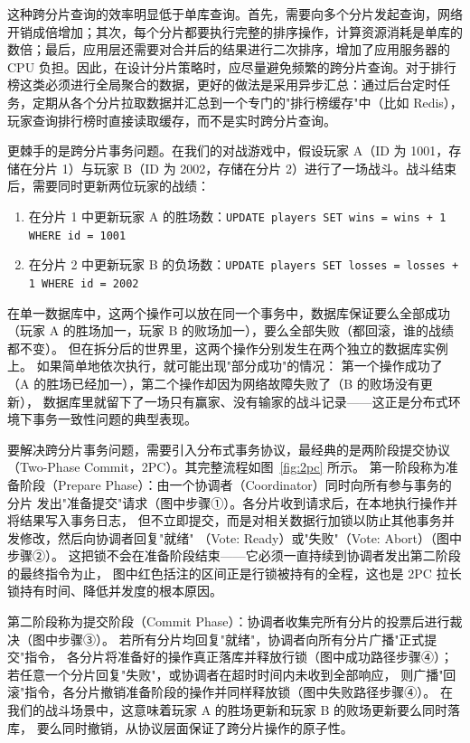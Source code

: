 这种跨分片查询的效率明显低于单库查询。首先，需要向多个分片发起查询，网络开销成倍增加；其次，每个分片都要执行完整的排序操作，计算资源消耗是单库的数倍；最后，应用层还需要对合并后的结果进行二次排序，增加了应用服务器的 CPU 负担。因此，在设计分片策略时，应尽量避免频繁的跨分片查询。对于排行榜这类必须进行全局聚合的数据，更好的做法是采用异步汇总：通过后台定时任务，定期从各个分片拉取数据并汇总到一个专门的"排行榜缓存"中（比如 Redis），玩家查询排行榜时直接读取缓存，而不是实时跨分片查询。

更棘手的是跨分片事务问题。在我们的对战游戏中，假设玩家 A（ID 为 1001，存储在分片 1）与玩家 B（ID 为 2002，存储在分片 2）进行了一场战斗。战斗结束后，需要同时更新两位玩家的战绩：

\begin{enumerate}
\item 在分片 1 中更新玩家 A 的胜场数：\texttt{UPDATE players SET wins = wins + 1 WHERE id = 1001}
\item 在分片 2 中更新玩家 B 的负场数：\texttt{UPDATE players SET losses = losses + 1 WHERE id = 2002}
\end{enumerate}

在单一数据库中，这两个操作可以放在同一个事务中，数据库保证要么全部成功
（玩家 A 的胜场加一，玩家 B 的败场加一），要么全部失败（都回滚，谁的战绩都不变）。
但在拆分后的世界里，这两个操作分别发生在两个独立的数据库实例上。
如果简单地依次执行，就可能出现"部分成功"的情况：
第一个操作成功了（A 的胜场已经加一），第二个操作却因为网络故障失败了（B 的败场没有更新），
数据库里就留下了一场只有赢家、没有输家的战斗记录——这正是分布式环境下事务一致性问题的典型表现。

要解决跨分片事务问题，需要引入分布式事务协议，最经典的是两阶段提交协议
（Two-Phase Commit，2PC）。其完整流程如图~\ref{fig:2pc} 所示。
第一阶段称为准备阶段（Prepare Phase）：由一个协调者（Coordinator）同时向所有参与事务的分片
发出"准备提交"请求（图中步骤①）。各分片收到请求后，在本地执行操作并将结果写入事务日志，
但不立即提交，而是对相关数据行加锁以防止其他事务并发修改，然后向协调者回复"就绪"
（Vote: Ready）或"失败"（Vote: Abort）（图中步骤②）。
这把锁不会在准备阶段结束——它必须一直持续到协调者发出第二阶段的最终指令为止，
图中红色括注的区间正是行锁被持有的全程，这也是 2PC 拉长锁持有时间、降低并发度的根本原因。

第二阶段称为提交阶段（Commit Phase）：协调者收集完所有分片的投票后进行裁决（图中步骤③）。
若所有分片均回复"就绪"，协调者向所有分片广播"正式提交"指令，
各分片将准备好的操作真正落库并释放行锁（图中成功路径步骤④）；
若任意一个分片回复"失败"，或协调者在超时时间内未收到全部响应，
则广播"回滚"指令，各分片撤销准备阶段的操作并同样释放锁（图中失败路径步骤④）。
在我们的战斗场景中，这意味着玩家 A 的胜场更新和玩家 B 的败场更新要么同时落库，
要么同时撤销，从协议层面保证了跨分片操作的原子性。

